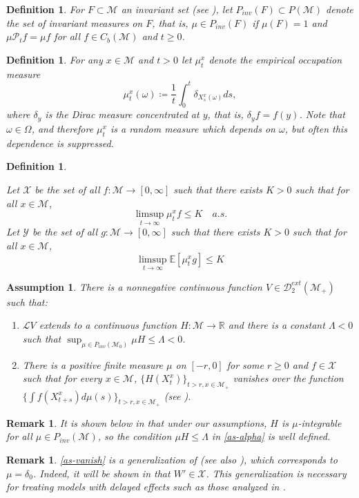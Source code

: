 \documentclass[final]{amsart}
\newtheorem{ass}{Assumption}[]
\newtheorem{deff}[thm]{Definition}
\newtheorem{rem}[thm]{Remark}
\numberwithin{thm}{section}
\numberwithin{equation}{section}
\newcommand{\E}{\mathbb{E}}
\newcommand{\mcM}{\mathcal{M}}
\newcommand{\Pp}{\mathcal{P}}
\newcommand{\R}{\mathbb{R}}
\newcommand{\inv}{\mathcal{M}_+}
\newcommand{\Dme}{\mathcal{D}^{ext}}
\newcommand{\Ll}{\mathcal{L}}
\newcommand{\X}{\mathcal{X}}
\newcommand{\Y}{\mathcal{Y}}
\begin{document}
\begin{deff} \label{inv-meas}
    For $F \subset \mcM$ an invariant set (see ), let $P_{inv}(F) \subset P(\mcM)$ denote the set of invariant measures on $F$, that is, $\mu \in P_{inv}(F)$ if $\mu(F) = 1$ and $\mu \Pp_tf = \mu f$ for all $f \in C_b(\mcM)$ and $t \geq 0$.
\end{deff}
\begin{deff}
\label{occ-meas}
    For any $x \in \mcM$ and $t > 0$ let $\mu_t^x$ denote the empirical occupation measure 
    \begin{equation}\label{eq:docm}
    \mu_t^x(\omega) \coloneqq \frac{1}{t}\int_0^t \delta_{X_s^x(\omega)}ds,    
    \end{equation}
    where $\delta_y$ is the Dirac  measure concentrated at $y$, that is, $\delta_y f = f(y)$. Note that $\omega \in \Omega$, and therefore $\mu_t^x$ is a random measure which depends on $\omega$, but often this dependence is suppressed.
\end{deff}


\begin{deff}\label{x-y-def}


Let $\X$ be the set of all $f : \mcM \to [0,\infty]$ such that there exists $K > 0$ such that for all $x \in \mcM$,
        $$\limsup_{t \to \infty} \mu_t^x f \leq K \quad a.s.$$
Let $\Y$ be the set of all $g : \mcM \to [0,\infty]$ such that there exists $K > 0$ such that for all $x \in \mcM$,
        $$\limsup_{t \to \infty} \E[\mu_t^x g] \leq K$$
\end{deff}



\begin{ass}
        \label{as-V} There is a nonnegative continuous function $V \in \Dme_2(\inv)$ such that:
    \begin{enumerate}[label=(\roman*)]
        \item \label{as-alpha} $\Ll V$ extends to a continuous function $H: \mcM \to \R$ and there is a constant $\Lambda < 0$ such that $\sup_{\mu \in P_{inv}(\mcM_0)} \mu H \leq \Lambda < 0$.
        \item \label{as-vanish} There is a positive finite measure $\mu$ on $[-r,0]$ for some $r \geq 0$ and $f \in \X$ such that for every $x \in \mcM$, $\{H(X_t^x)\}_{t > r, x \in \inv}$ vanishes over the function $\{\int f(X_{t+s}^x)d\mu(s)\}_{t > r, x \in \inv}$ (see ). 
    \end{enumerate}
\end{ass} 
\begin{rem}
    It is shown below in  that under our assumptions, $H$ is $\mu$-integrable for all $\mu \in P_{inv}(\mcM)$, so the condition $\mu H \leq \Lambda$ in \ref{as-alpha} is well defined.
\end{rem}
\begin{rem}
    \ref{as-vanish} is a generalization of \cite[Assumption 4(ii)]{extinction} (see also \cite[Hypothesis 4(ii)]{persistence}), which corresponds to $\mu = \delta_0$. Indeed, it will be shown in  that $W' \in \X$. This generalization is necessary for treating models with delayed effects such as those analyzed in \cite{functional}.
\end{rem}
\end{document}
